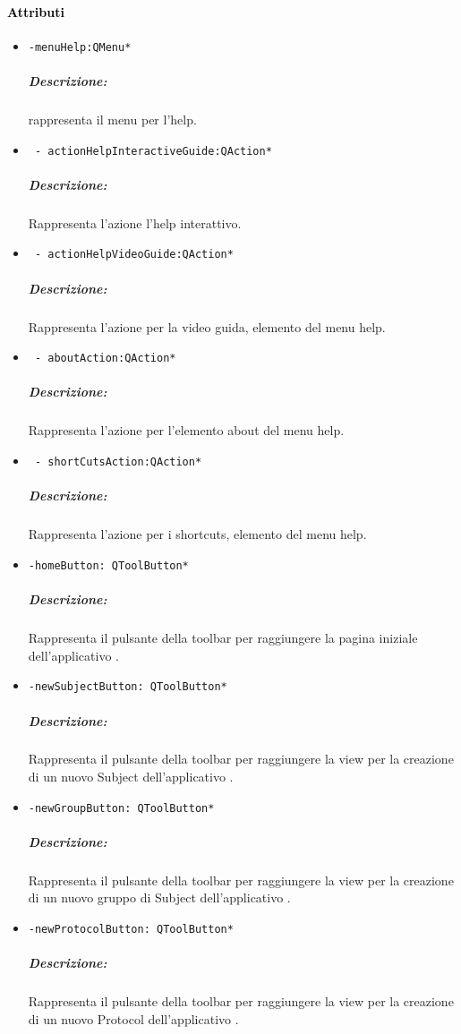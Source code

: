 \paragraph{\textcolor{black}{Attributi\\}}
\begin{itemize}
\item \color{teal}\verb!-menuHelp:QMenu*!
\color{black}
\subparagraph{Descrizione:} rappresenta il menu per l'help.
\item \color{teal}\verb! - actionHelpInteractiveGuide:QAction*!
\color{black} 
\subparagraph{Descrizione: } Rappresenta l'azione l'help interattivo.

\item \color{teal}\verb! - actionHelpVideoGuide:QAction*!
\color{black} 
\subparagraph{Descrizione: } Rappresenta l'azione per la video guida, elemento del menu help.

\item \color{teal}\verb! - aboutAction:QAction*!
\color{black} 
\subparagraph{Descrizione: } Rappresenta l'azione per l'elemento about del menu help.

\item \color{teal}\verb! - shortCutsAction:QAction*!
\color{black} 
\subparagraph{Descrizione: } Rappresenta l'azione per i shortcuts, elemento del menu help.
\item \color{teal}\verb!-homeButton: QToolButton*!
\color{black}
\subparagraph{Descrizione:} Rappresenta il pulsante della toolbar per raggiungere la pagina iniziale dell'applicativo \project{}.

\item \color{teal}\verb!-newSubjectButton: QToolButton*!
\color{black}
\subparagraph{Descrizione:} Rappresenta il pulsante della toolbar per raggiungere la view per la creazione di un nuovo Subject\g{} dell'applicativo \project{}.

\item \color{teal}\verb!-newGroupButton: QToolButton*!
\color{black}
\subparagraph{Descrizione:} Rappresenta il pulsante della toolbar per raggiungere la view per la creazione di un nuovo gruppo di Subject\g{} dell'applicativo \project{}.

\item \color{teal}\verb!-newProtocolButton: QToolButton*!
\color{black}
\subparagraph{Descrizione:} Rappresenta il pulsante della toolbar per raggiungere la view per la creazione di un nuovo Protocol\g{} dell'applicativo \project{}.


\end{itemize}
